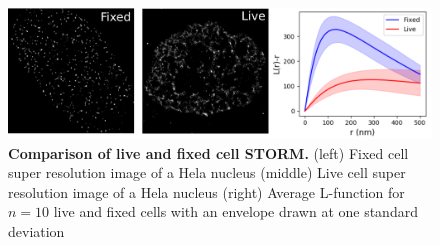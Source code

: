\documentclass{ucetd}
\begin{document}
\begin{figure}
\begin{center}
\includegraphics[width=16cm]{LiveFix.png}
\end{center}
\caption{\textbf{Comparison of live and fixed cell STORM.} (left) Fixed cell super resolution image of a Hela nucleus (middle) Live cell super resolution image of a Hela nucleus (right) Average L-function for $n=10$ live and fixed cells with an envelope drawn at one standard deviation}
\end{figure}
\end{document}
